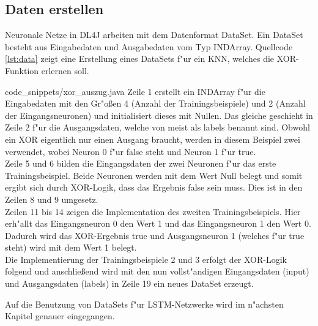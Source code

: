 {\subsection{Daten erstellen}
Neuronale Netze in DL4J arbeiten mit dem Datenformat DataSet. Ein DataSet besteht aus Eingabedaten und Ausgabedaten vom Typ INDArray. Quellcode \ref{lst:data} zeigt eine Erstellung eines DataSets f"ur ein KNN, welches die XOR-Funktion erlernen soll.

{code_snippets/xor_auszug.java}
Zeile 1 erstellt ein INDArray f"ur die Eingabedaten mit den Gr"o{\ss}en 4 (Anzahl der Trainingsbeispiele) und 2 (Anzahl der Eingangsneuronen) und initialisiert dieses mit Nullen. Das gleiche geschieht in Zeile 2 f"ur die Ausgangsdaten, welche von \cite{DL4J} meist als labels benannt sind. Obwohl ein XOR eigentlich nur einen Ausgang braucht, werden in diesem Beispiel zwei verwendet, wobei Neuron 0 f"ur false steht und Neuron 1 f"ur true.\\
Zeile 5 und 6 bilden die Eingangsdaten der zwei Neuronen f"ur das erste Trainingsbeispiel. Beide Neuronen werden mit dem Wert Null belegt und somit ergibt sich durch XOR-Logik, dass das Ergebnis false sein muss. Dies ist in den Zeilen 8 und 9 umgesetz.\\
Zeilen 11 bis 14 zeigen die Implementation des zweiten Trainingsbeispiels. Hier erh"allt das Eingangsneuron 0 den Wert 1 und das Eingangsneuron 1 den Wert 0. Dadurch wird das XOR-Ergebnis true und Ausgangsneuron 1 (welches f"ur true steht) wird mit dem Wert 1 belegt.\\
Die Implementierung der Trainingsbeispiele 2 und 3 erfolgt der XOR-Logik folgend und anschlie{\ss}end wird mit den nun vollst"andigen Eingangsdaten (input) und Ausgangsdaten (labels) in Zeile 19 ein neues DataSet erzeugt.

Auf die Benutzung von DataSets f"ur LSTM-Netzwerke wird im n"achsten Kapitel genauer eingegangen.

} %
